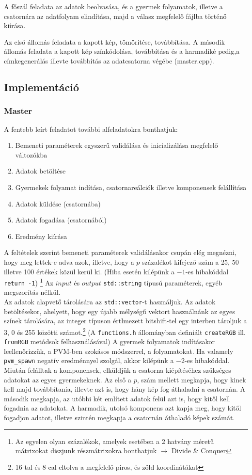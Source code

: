 \documentclass[12pt]{article}
\begin{document}
A főszál feladata az adatok beolvasása, és a gyermek folyamatok, illetve a csatornára az adatfolyam elindítása, majd a válasz megfelelő fájlba történő kiírása.

Az első állomás feladata a kapott kép, tömörítése, továbbítása. A második állomás feladata a kapott kép színkódolása, továbbítása és a harmadiké pedig,a címkegenerálás illevte továbbítás az adatcsatorna végébe (master.cpp).

\subsection{Implementáció}
\subsubsection{Master}
    
    A fentebb leírt feladatot további alfeladatokra bonthatjuk:
\begin{enumerate}
    \item Bemeneti paraméterek egyszerű validálása és inicializálása megfelelő változókba
    \item Adatok betöltése
    \item Gyermekek folyamat indítása, csatornareálciók illetve komponensek felállítása
    \item Adatok küldése (csatornába)
    \item Adatok fogadása (csatornából)
    \item Eredmény kiírása
\end{enumerate}
    
A feltételek szerint bemeneti paraméterek validálásakor csupán elég megnézni, hogy meg lettek-e adva azok, illetve, hogy a $p$ százalékot kifejező szám a 25, 50 illetve 100 értékek közül kerül ki. (Hiba esetén kilépünk a $-1$-es hibakóddal \verb|return -1|) \footnote{Az egyelen olyan százalékok, amelyek esetében a 2 hatvány méretű mátrixokat diszjunk részmátrixokra bonthatjuk $\rightarrow$ Divide \& Conquer}
Az $input$ és $output$ \verb|std::string| típusú paraméterek, egyéb megszorítás nélkül.\\
Az adatok alapvető tárolására az \verb|std::vector|-t használjuk. Az adatok betöltésekor, ahelyett, hogy egy újabb mélységű vektort használnánk az egyes színek tárolására, az integer típuson értlmezett bitshift-tel egy interben tároljuk a 3, 0 és 255 közötti számot.\footnote{16-tal és 8-cal eltolva a megfelelő piros, és zöld koordinátákat} (A \verb|functions.h| állományban definiált \verb|createRGB| ill. \verb|fromRGB| metódsok felhasználásával)
A gyermek folyamatok indításakor leellenőrizzük, a PVM-ben szokásos módszerrel, a folyamatokat. Ha valamely \verb|pvm_spawn| negatív eredménnyel szolgál, akkor kilépünk a $-2$-es hibakóddal.
Miután felálltak a komponensek, elküldjük a csatorna kiépítéséhez szükséges adatokat az egyes gyermekeknek. Az első a $p$, szám mellett megkapja, hogy kinek kell majd továbbítania, illevte azt is, hogy hány kép fog áthaladni a csatornán.
A második megkapja, az utóbbi két említett adatok felül azt is, hogy kitől kell fogadnia az adatokat.
A harmadik, utolsó komponens azt kapja meg, hogy kitől fogadjon adatot, illetve szintén megkapja a csatornán áthaladó képek számát.
\end{document}
